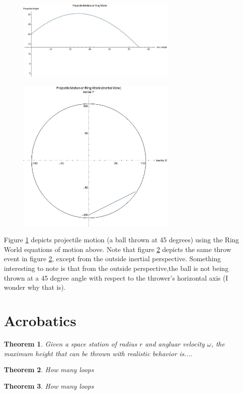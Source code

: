 \documentclass{amsart}
\newtheorem{theorem}{Theorem}[section]
\theoremstyle{definition}
\begin{document}
\begin{figure}[h]
  \centering
  \includegraphics[width=0.7\textwidth]{ArclengthProjectileLabeled.jpg}
  \label{fig:shipview}
  \caption{}
\end{figure}


\begin{figure}[h]
  \centering
  \includegraphics[width=0.7\textwidth]{InertialArclengthProjectileLabeled.jpg}
  \label{fig:inertialview}
  \caption{}
\end{figure}

Figure \ref{fig:shipview} depicts projectile motion (a ball thrown at
45 degrees) using the Ring World equations of motion above. Note that
figure \ref{fig:inertialview} depicts the same throw event in figure
\ref{fig:inertialview}, except from the outside inertial
perspective. Something interesting to note is that from the outside
perspective,the ball is not being thrown at a 45 degree angle with
respect to the thrower's horizontal axis (I wonder why that is).


\section{Acrobatics}



\begin{theorem}
  Given a space station of radius $r$ and angluar velocity $\omega$, the maximum height that can be thrown with realistic behavior is....
\end{theorem}

\begin{theorem}
  How many loops
\end{theorem}


\begin{theorem}
  How many loops
\end{theorem}
\end{document}
